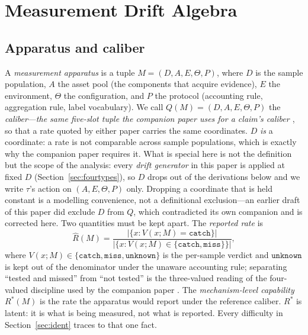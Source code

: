 \documentclass{article}
\newcommand{\Rhat}{\hat R}
\newcommand{\Rstar}{R^{*}}
\newcommand{\catch}{\texttt{catch}}
\newcommand{\miss}{\texttt{miss}}
\newcommand{\unk}{\texttt{unknown}}
\begin{document}
\section{Measurement Drift Algebra}
\label{sec:algebra}

\subsection{Apparatus and caliber}
\label{sec:apparatus}

A \emph{measurement apparatus} is a tuple $M=(D,A,E,\Theta,P)$, where $D$ is the sample population, $A$ the
asset pool (the components that acquire evidence), $E$ the environment, $\Theta$ the configuration, and $P$
the protocol (accounting rule, aggregation rule, label vocabulary). We call $Q(M)=(D,A,E,\Theta,P)$ the
\emph{caliber}---\emph{the same five-slot tuple the companion paper uses for a claim's caliber
\citep{queyi2027caliber}}, so that a rate quoted by either paper carries the same coordinates.
$D$ \emph{is} a coordinate: a rate is not comparable across sample populations, which is exactly why the
companion paper requires it. What is special here is not the definition but the scope of the analysis:
every \emph{drift generator} in this paper is applied at fixed $D$ (Section~\ref{sec:fourtypes}), so $D$
drops out of the derivations below and we write $\tau$'s action on $(A,E,\Theta,P)$ only. Dropping a
coordinate that is held constant is a modelling convenience, not a definitional exclusion---an earlier
draft of this paper did exclude $D$ from $Q$, which contradicted its own companion and is corrected here.
Two quantities must be kept apart. The \emph{reported rate} is
\begin{equation}
\Rhat(M)=\frac{\bigl|\{x: V(x;M)=\catch\}\bigr|}{\bigl|\{x: V(x;M)\in\{\catch,\miss\}\}\bigr|},
\label{eq:rhat}
\end{equation}
where $V(x;M)\in\{\catch,\miss,\unk\}$ is the per-sample verdict and $\unk$ is kept out of the denominator
under the unaware accounting rule; separating ``tested and missed'' from ``not tested'' is the
three-valued reading of the four-valued discipline used by the companion paper
\citep{belnap1977useful}. The \emph{mechanism-level capability} $\Rstar(M)$ is the rate the
apparatus would report under the reference caliber. $\Rstar$ is latent: it is what is being measured, not
what is reported. Every difficulty in Section~\ref{sec:ident} traces to that one fact.
\end{document}
